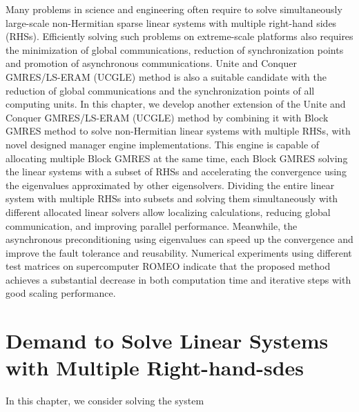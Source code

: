 \begin{displayquote}
	\textsf{Many problems in science and engineering often require to solve simultaneously large-scale non-Hermitian sparse linear systems with multiple right-hand sides (RHSs). Efficiently solving such problems on extreme-scale platforms also requires the minimization of global communications, reduction of synchronization points and promotion of asynchronous communications. Unite and Conquer GMRES/LS-ERAM (UCGLE) method is also a suitable candidate with the reduction of global communications and the synchronization points of all computing units. In this chapter, we develop another extension of the Unite and Conquer GMRES/LS-ERAM (UCGLE) method by combining it with Block GMRES method to solve non-Hermitian linear systems with multiple RHSs, with novel designed manager engine implementations. This engine is capable of allocating multiple Block GMRES at the same time, each Block GMRES solving the linear systems with a subset of RHSs and accelerating the convergence using the eigenvalues approximated by other eigensolvers. Dividing the entire linear system with multiple RHSs into subsets and solving them simultaneously with different allocated linear solvers allow localizing calculations, reducing global communication, and improving parallel performance. Meanwhile, the asynchronous preconditioning using eigenvalues can speed up the convergence and improve the fault tolerance and reusability. Numerical experiments using different test matrices on supercomputer ROMEO indicate that the proposed method achieves a substantial decrease in both computation time and iterative steps with good scaling performance.}
\end{displayquote}

\vspace{0.6in}

\section{Demand to Solve Linear Systems with Multiple Right-hand-sdes}

In this chapter, we consider solving the system

